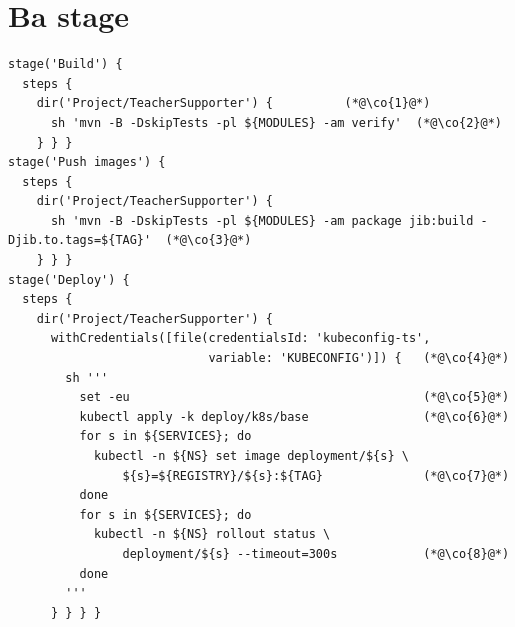 \section{Ba stage}

\begin{lstlisting}
stage('Build') {
  steps {
    dir('Project/TeacherSupporter') {          (*@\co{1}@*)
      sh 'mvn -B -DskipTests -pl ${MODULES} -am verify'  (*@\co{2}@*)
    } } }
stage('Push images') {
  steps {
    dir('Project/TeacherSupporter') {
      sh 'mvn -B -DskipTests -pl ${MODULES} -am package jib:build -Djib.to.tags=${TAG}'  (*@\co{3}@*)
    } } }
stage('Deploy') {
  steps {
    dir('Project/TeacherSupporter') {
      withCredentials([file(credentialsId: 'kubeconfig-ts',
                            variable: 'KUBECONFIG')]) {   (*@\co{4}@*)
        sh '''
          set -eu                                         (*@\co{5}@*)
          kubectl apply -k deploy/k8s/base                (*@\co{6}@*)
          for s in ${SERVICES}; do
            kubectl -n ${NS} set image deployment/${s} \
                ${s}=${REGISTRY}/${s}:${TAG}              (*@\co{7}@*)
          done
          for s in ${SERVICES}; do
            kubectl -n ${NS} rollout status \
                deployment/${s} --timeout=300s            (*@\co{8}@*)
          done
        '''
      } } } }
\end{lstlisting}

